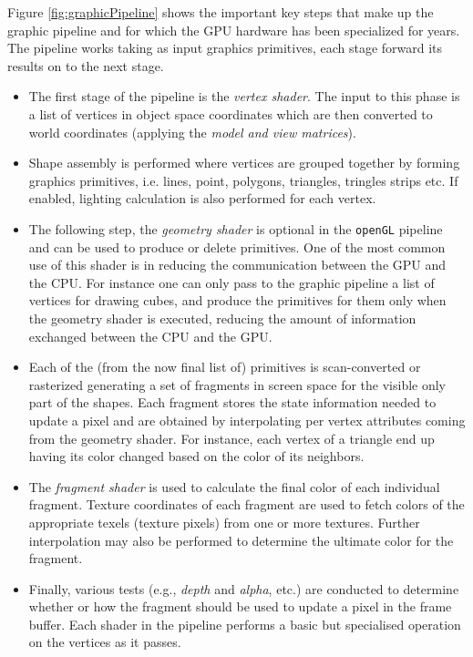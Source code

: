 \begin{description}
     Figure \ref{fig:graphicPipeline} shows the important key steps that make up the graphic pipeline and for which the GPU hardware has been specialized for years. The pipeline works taking as input graphics primitives, each stage forward its results on to the next stage.
    \begin{itemize}
    	\item     The first stage of the pipeline is the \textit{vertex shader}. The
    	input to this phase is a list of vertices in object space coordinates which are then converted to world coordinates (applying the \textit{model and view matrices}).
    	\item  Shape assembly is performed where vertices are grouped together by forming graphics primitives, i.e. lines, point, polygons, triangles, tringles strips etc. If enabled, lighting calculation is also performed for each vertex.
    	\item   The following step, the \textit{geometry shader} is optional in the \texttt{openGL} pipeline and can be used to produce or delete primitives. One of the most common use of this shader is in reducing the communication between the GPU and the CPU. For instance one can only pass to the graphic pipeline a list of vertices for drawing cubes, and produce the primitives for them only when the geometry shader is executed, reducing the amount of information exchanged between the CPU and the GPU.
    	\item   Each of the (from the now final list of) primitives is scan-converted or rasterized generating a set of fragments in screen space for the visible only part of the shapes. Each fragment stores the state information needed to update a pixel and are obtained by interpolating per vertex attributes coming from the geometry shader. For instance, each vertex of a triangle end up having its color changed based on the  color of its neighbors. 
    	\item  The \textit{fragment  shader} is used to calculate the final color of each individual fragment. Texture coordinates of each fragment are used to fetch colors of the appropriate texels (texture pixels) from
    	one or more textures. Further interpolation may also be
    	performed to determine the ultimate color for the fragment.
    	\item Finally, various tests (e.g., \textit{depth} and \textit{alpha}, etc.) are conducted to determine whether or how the fragment should be used to update a pixel in the frame buffer.    
    	Each shader in the pipeline performs a basic but specialised operation on the
    	vertices as it passes. 
    \end{itemize}


\end{description}
